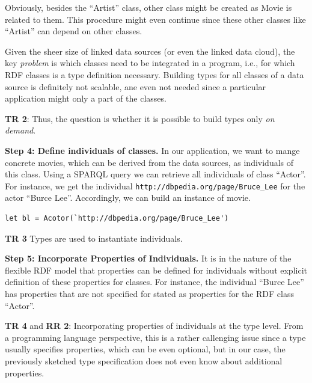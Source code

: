 \documentclass{llncs} %
\newcommand{\rr}[1]{\textbf{RR #1}}
\newcommand{\tr}[1]{\textbf{TR #1}}
\begin{document}
Obviously, besides the ``Artist'' class, other class might be created as Movie is related to them. This procedure might even continue since
these other classes like ``Artist'' can depend on other classes.

Given the sheer size of linked data sources (or even the linked data cloud), the key \emph{problem} is which classes need to be 
integrated in a program, i.e., for which RDF classes is a type definition necessary. Building types for all classes of a
data source is definitely not scalable, ane even not needed since a particular application 
might only a part of the classes.

\tr{2}: Thus, the question is whether it is possible to build types only \emph{on demand}.

\vspace{0.8em}
\noindent
\textbf{Step 4: Define individuals of classes.}
In our application, we want to mange concrete movies, which can be derived from the data sources,
as individuals of this class. Using a SPARQL query we can retrieve all individuals of class ``Actor''.
For instance, we get the individual \texttt{http://dbpedia.org/page/Bruce_Lee} for the actor ``Burce Lee''.
Accordingly, we can build an instance of movie.

\begin{lstlisting}[style=code, caption={Individual of  ``Actor'' }, label={lst:skyfall}]
  let bl = Acotor(`http://dbpedia.org/page/Bruce_Lee')
\end{lstlisting}

\tr{3} Types are used to instantiate individuals. 

\vspace{0.8em}
\noindent
\textbf{Step 5: Incorporate Properties of Individuals.}
It is in the nature of the flexible RDF model that properties can be defined for individuals 
without explicit definition of these properties for classes. For instance, the individual
``Burce Lee'' has properties that are not specified for stated as properties for the RDF class ``Actor''.

\tr{4} and \rr{2}: Incorporating properties of individuals at the type level. From a programming language perspective,
this is a rather callenging issue since a type usually specifies properties, which can be even optional,
but in our case, the previously sketched type specification does not even know about additional properties.
\end{document}
